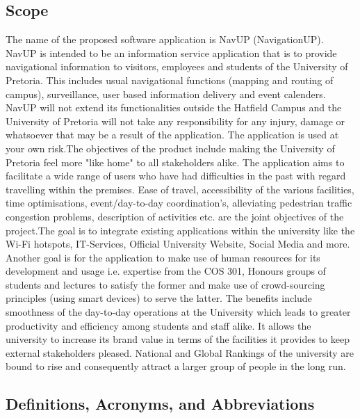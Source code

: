 \documentclass[runningheads,a4paper]{article}
\begin{document}
\subsection{Scope}
The name of the proposed software application is NavUP (NavigationUP). NavUP is intended to be an information service application that is to provide navigational information to visitors, employees and students of the University of Pretoria. This includes usual navigational functions (mapping and routing of campus), surveillance, user based information delivery and event calenders. NavUP will not extend its functionalities outside the Hatfield Campus and the University of Pretoria will not take any responsibility for any injury, damage or whatsoever that may be a result of the application. The application is used at your own risk.\newline \newline The objectives of the product include making the University of Pretoria feel more "like home" to all stakeholders alike. The application aims to facilitate a wide range of users who have had difficulties in the past with regard travelling within the premises. Ease of travel, accessibility of the various facilities, time optimisations, event/day-to-day coordination's, alleviating pedestrian traffic congestion problems, description of activities etc. are the joint objectives of the project.\newline \newline The goal is to integrate existing applications within the university like the Wi-Fi hotspots, IT-Services, Official University Website, Social Media and more.  Another goal is for the application to make use of human resources for its development and usage i.e. expertise from the COS 301, Honours groups of students and lectures to satisfy the former and make use of crowd-sourcing principles (using smart devices) to serve the latter. \newline \newline The benefits include smoothness of the day-to-day operations at the University which leads to greater productivity and efficiency among students and staff alike. It allows the university to increase its brand value in terms of the facilities it provides to keep external stakeholders pleased. National and Global Rankings of the university are bound to rise and consequently attract a larger group of people in the long run.

\subsection{Definitions, Acronyms, and Abbreviations}
\end{document}
